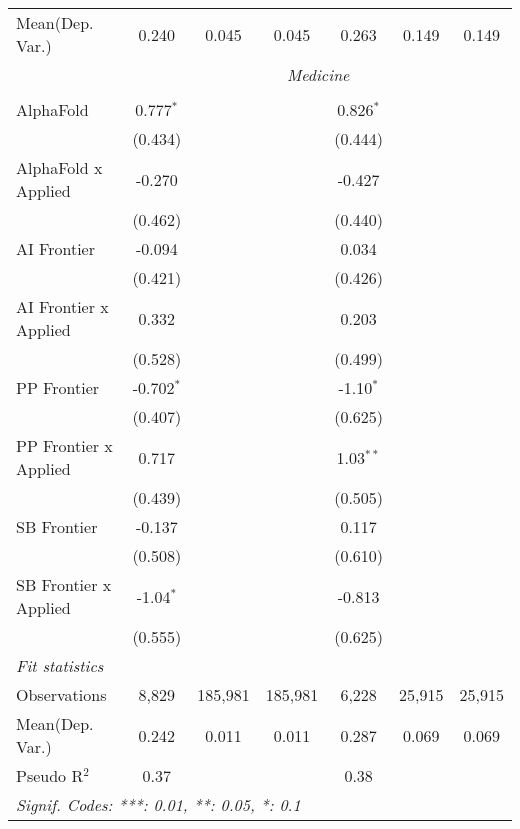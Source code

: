 \begin{tabular}{lcccccc}
Mean(Dep. Var.) & 0.240 & 0.045 & 0.045 & 0.263 & 0.149 & 0.149 \\
 & \multicolumn{6}{c}{\textit{Medicine}} \\ \\
   AlphaFold             & 0.777$^{*}$  &         &         & 0.826$^{*}$ &        &   \\   
                         & (0.434)      &         &         & (0.444)     &        &   \\   
   AlphaFold x Applied   & -0.270       &         &         & -0.427      &        &   \\   
                         & (0.462)      &         &         & (0.440)     &        &   \\   
   AI Frontier           & -0.094       &         &         & 0.034       &        &   \\   
                         & (0.421)      &         &         & (0.426)     &        &   \\   
   AI Frontier x Applied & 0.332        &         &         & 0.203       &        &   \\   
                         & (0.528)      &         &         & (0.499)     &        &   \\   
   PP Frontier           & -0.702$^{*}$ &         &         & -1.10$^{*}$ &        &   \\   
                         & (0.407)      &         &         & (0.625)     &        &   \\   
   PP Frontier x Applied & 0.717        &         &         & 1.03$^{**}$ &        &   \\   
                         & (0.439)      &         &         & (0.505)     &        &   \\   
   SB Frontier           & -0.137       &         &         & 0.117       &        &   \\   
                         & (0.508)      &         &         & (0.610)     &        &   \\   
   SB Frontier x Applied & -1.04$^{*}$  &         &         & -0.813      &        &   \\   
                         & (0.555)      &         &         & (0.625)     &        &   \\   
   \midrule
   \emph{Fit statistics}\\
   Observations          & 8,829        & 185,981 & 185,981 & 6,228       & 25,915 & 25,915\\  
Mean(Dep. Var.) & 0.242 & 0.011 & 0.011 & 0.287 & 0.069 & 0.069 \\
   Pseudo R$^2$          & 0.37         &         &         & 0.38        &        & \\  
   \midrule \midrule
   \multicolumn{7}{l}{\emph{Signif. Codes: ***: 0.01, **: 0.05, *: 0.1}}\\
\end{tabular}
\par\endgroup

